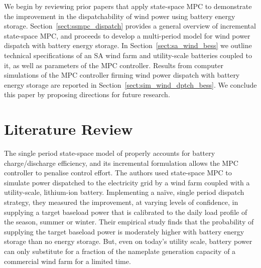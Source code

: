 \documentclass[a4paper, 10pt, twocolumn, preprint, 3p]{elsarticle}
\begin{document}

We begin by reviewing prior papers that apply state-space MPC to demonstrate the improvement in the dispatchability of wind power using battery energy storage.  Section~\ref{sect:ssmpc_dispatch} provides a general overview of incremental state-space MPC, and proceeds to develop a multi-period model for wind power dispatch with battery energy storage.  In Section~\ref{sect:sa_wind_bess} we outline technical specifications of an SA wind farm and utility-scale batteries coupled to it, as well as parameters of the MPC controller.  Results from computer simulations of the MPC controller firming wind power dispatch with battery energy storage are reported in Section~\ref{sect:sim_wind_dptch_bess}.  We conclude this paper by proposing directions for future research.

\section{Literature Review}\label{sect:lit_review}
The single period state-space model of \cite{TREB16} properly accounts for battery charge/discharge efficiency, and its incremental formulation allows the MPC controller to penalise control effort.  The authors used state-space MPC to simulate power dispatched to the electricity grid by a wind farm coupled with a utility-scale, lithium-ion battery.  Implementing a na\"ive, single period dispatch strategy, they measured the improvement, at varying levels of confidence, in supplying a target baseload power that is calibrated to the daily load profile of the season, summer or winter.  Their empirical study finds that the probability of supplying the target baseload power is moderately higher with battery energy storage than no energy storage.  But, even on today's utility scale, battery power can only substitute for a fraction of the nameplate generation capacity of a commercial wind farm for a limited time.
\end{document}
